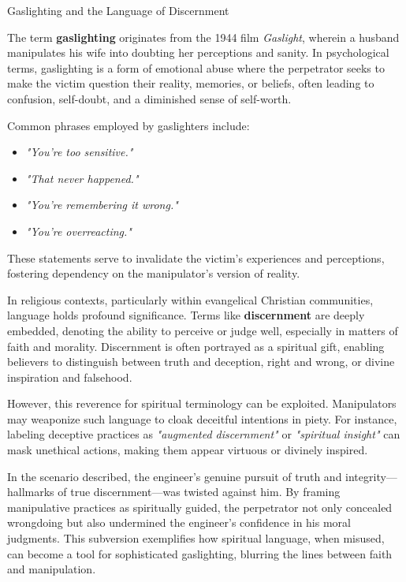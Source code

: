 \begin{HistoricalSidebar}{Gaslighting and the Language of Discernment}

    The term \textbf{gaslighting} originates from the 1944 film \textit{Gaslight}, wherein a husband manipulates his wife into doubting her perceptions and sanity. In psychological terms, gaslighting is a form of emotional abuse where the perpetrator seeks to make the victim question their reality, memories, or beliefs, often leading to confusion, self-doubt, and a diminished sense of self-worth.
    
    \medskip
    
    Common phrases employed by gaslighters include:
    
    \begin{itemize}
        \item \textit{"You're too sensitive."}
        \item \textit{"That never happened."}
        \item \textit{"You're remembering it wrong."}
        \item \textit{"You're overreacting."}
    \end{itemize}
    
    \medskip
    
    These statements serve to invalidate the victim's experiences and perceptions, fostering dependency on the manipulator's version of reality.
    
    \medskip
    
    In religious contexts, particularly within evangelical Christian communities, language holds profound significance. Terms like \textbf{discernment} are deeply embedded, denoting the ability to perceive or judge well, especially in matters of faith and morality. Discernment is often portrayed as a spiritual gift, enabling believers to distinguish between truth and deception, right and wrong, or divine inspiration and falsehood.
    
    \medskip
    
    However, this reverence for spiritual terminology can be exploited. Manipulators may weaponize such language to cloak deceitful intentions in piety. For instance, labeling deceptive practices as \textit{"augmented discernment"} or \textit{"spiritual insight"} can mask unethical actions, making them appear virtuous or divinely inspired.
    
    \medskip
    
    In the scenario described, the engineer's genuine pursuit of truth and integrity—hallmarks of true discernment—was twisted against him. By framing manipulative practices as spiritually guided, the perpetrator not only concealed wrongdoing but also undermined the engineer's confidence in his moral judgments. This subversion exemplifies how spiritual language, when misused, can become a tool for sophisticated gaslighting, blurring the lines between faith and manipulation.
    

\end{HistoricalSidebar}
